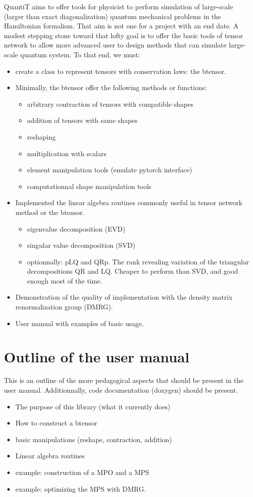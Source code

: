 \documentclass[15pt]{book}
\begin{document}
QuantiT aims to offer tools for physicist to perform simulation of large-scale (larger than exact diagonalization) quantum mechanical problems in the Hamiltonian formalism. That aim is not one for a project with an end date. A modest stepping stone toward that lofty goal is to offer the basic tools of tensor network to allow more advanced user to design methods that can simulate large-scale quantum system.
To that end, we must:
\begin{itemize}
    \item create a class to represent tensors with conservation laws: the btensor.
    \item Minimally, the btensor offer the following methods or functions:
    \begin{itemize}
        \item arbitrary contraction of tensors with compatible shapes
        \item addition of tensors with same shapes
        \item reshaping
        \item multiplication with scalars
        \item element manipulation tools (emulate pytorch interface)
        \item computationnal shape manipulation tools
    \end{itemize}
    \item Implemented the linear algebra routines commonly useful in tensor network method or the btensor.
    \begin{itemize}
        \item eigenvalue decomposition (EVD)
        \item singular value decomposition (SVD)
        \item optionnally: pLQ and QRp. The rank revealing variation of the triangular decompositions QR and LQ. Cheaper to perform than SVD, and good enough most of the time.
    \end{itemize}
    \item Demonstration of the quality of implementation with the density matrix renormalization group (DMRG).
    \item User manual with examples of basic usage.
\end{itemize}
\section{Outline of the user manual}
This is an outline of the more pedagogical aspects that should be present in the user manual.
Additionnally, code documentation (doxygen) should be present.
\begin{itemize}
    \item The purpose of this library (what it currently does)
    \item How to construct a btensor
    \item basic manipulations (reshape, contraction, addition)
    \item Linear algebra routines
    \item example: construction of a MPO and a MPS
    \item example: optimizing the MPS with DMRG.
\end{itemize}
\end{document}
